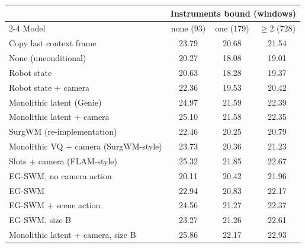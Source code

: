 \begin{tabular}{lccc}
\toprule
 & \multicolumn{3}{c}{Instruments bound (windows)} \\
\cmidrule(lr){2-4}
Model & none (93) & one (179) & $\geq$2 (728) \\
\midrule
Copy last context frame & 23.79 & 20.68 & 21.54 \\
None (unconditional) & 20.27 & 18.08 & 19.01 \\
Robot state & 20.63 & 18.28 & 19.37 \\
Robot state + camera & 22.36 & 19.53 & 20.42 \\
Monolithic latent (Genie) & 24.97 & 21.59 & 22.39 \\
Monolithic latent + camera & 25.10 & 21.58 & 22.35 \\
SurgWM (re-implementation) & 22.46 & 20.25 & 20.79 \\
Monolithic VQ + camera (SurgWM-style) & 23.73 & 20.36 & 21.23 \\
Slots + camera (FLAM-style) & 25.32 & 21.85 & 22.67 \\
EG-SWM, no camera action & 20.11 & 20.42 & 21.96 \\
EG-SWM & 22.94 & 20.83 & 22.17 \\
EG-SWM + scene action & 24.56 & 21.27 & 22.37 \\
EG-SWM, size B & 23.27 & 21.26 & 22.61 \\
Monolithic latent + camera, size B & 25.86 & 22.17 & 22.93 \\
\bottomrule
\end{tabular}
